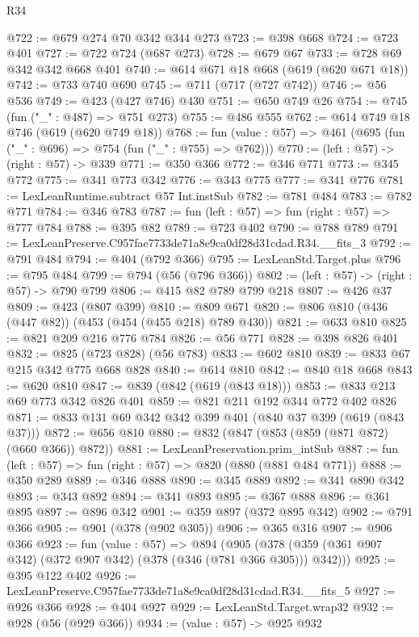 \begin{lexlean}{R34}
\begin{coremodule}
@722 := @679 @274 @70 @342 @344 @273
@723 := @398 @668
@724 := @723 @401
@727 := @722 @724 (@687 @273)
@728 := @679 @67
@733 := @728 @69 @342 @342 @668 @401
@740 := @614 @671 @18 @668 (@619 (@620 @671 @18))
@742 := @733 @740 @690
@745 := @711 (@717 (@727 @742))
@746 := @56 @536
@749 := @423 (@427 @746) @430
@751 := @650 @749 @26
@754 := @745 (fun ("_" : @487) => @751 @273)
@755 := @486 @555
@762 := @614 @749 @18 @746 (@619 (@620 @749 @18))
@768 := fun (value : @57) => @461 (@695 (fun ("_" : @696) => @754 (fun ("_" : @755) => @762)))
@770 := (left : @57) -> (right : @57) -> @339
@771 := @350 @366
@772 := @346 @771
@773 := @345 @772
@775 := @341 @773 @342
@776 := @343 @775
@777 := @341 @776
@781 := LexLeanRuntime.subtract @57 Int.instSub
@782 := @781 @484
@783 := @782 @771
@784 := @346 @783
@787 := fun (left : @57) => fun (right : @57) => @777 @784
@788 := @395 @82
@789 := @723 @402
@790 := @788 @789
@791 := LexLeanPreserve.C957fae7733de71a8e9ca0df28d31cdad.R34.__fits_3
@792 := @791 @484
@794 := @404 (@792 @366)
@795 := LexLeanStd.Target.plus
@796 := @795 @484
@799 := @794 (@56 (@796 @366))
@802 := (left : @57) -> (right : @57) -> @790 @799
@806 := @415 @82 @789 @799 @218
@807 := @426 @37
@809 := @423 (@807 @399)
@810 := @809 @671
@820 := @806 @810 (@436 (@447 @82)) (@453 (@454 (@455 @218) @789 @430))
@821 := @633 @810
@825 := @821 @209 @216 @776 @784
@826 := @56 @771
@828 := @398 @826 @401
@832 := @825 (@723 @828) (@56 @783)
@833 := @602 @810
@839 := @833 @67 @215 @342 @775 @668 @828
@840 := @614 @810
@842 := @840 @18 @668
@843 := @620 @810
@847 := @839 (@842 (@619 (@843 @18)))
@853 := @833 @213 @69 @773 @342 @826 @401
@859 := @821 @211 @192 @344 @772 @402 @826
@871 := @833 @131 @69 @342 @342 @399 @401 (@840 @37 @399 (@619 (@843 @37)))
@872 := @656 @810
@880 := @832 (@847 (@853 (@859 (@871 @872) (@660 @366)) @872))
@881 := LexLeanPreservation.prim_intSub
@887 := fun (left : @57) => fun (right : @57) => @820 (@880 (@881 @484 @771))
@888 := @350 @289
@889 := @346 @888
@890 := @345 @889
@892 := @341 @890 @342
@893 := @343 @892
@894 := @341 @893
@895 := @367 @888
@896 := @361 @895
@897 := @896 @342
@901 := @359 @897 (@372 @895 @342)
@902 := @791 @366
@905 := @901 (@378 (@902 @305))
@906 := @365 @316
@907 := @906 @366
@923 := fun (value : @57) =>
  @894 (@905 (@378 (@359 (@361 @907 @342) (@372 @907 @342) (@378 (@346 (@781 @366 @305))) @342)))
@925 := @395 @122 @402
@926 := LexLeanPreserve.C957fae7733de71a8e9ca0df28d31cdad.R34.__fits_5
@927 := @926 @366
@928 := @404 @927
@929 := LexLeanStd.Target.wrap32
@932 := @928 (@56 (@929 @366))
@934 := (value : @57) -> @925 @932

\end{coremodule}
\end{lexlean}
